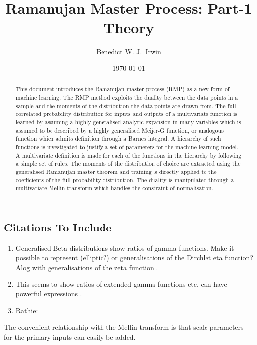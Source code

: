 \documentclass[journal=jcisd8,manuscript=article,layout=onecolumn,pdftex,floatfix,amsmath,amssymb,10pt]{achemso}
\title{Ramanujan Master Process: Part-1 \\ \large Theory }
\author{Benedict W. J.~Irwin}
\affiliation{Optibrium, F5-6 Blenheim House, Cambridge Innovation Park,
Denny End Road, Cambridge, CB25 9PB, United Kingdom}
\date{\today}
\begin{document}
\begin{abstract}
This document introduces the Ramanujan master process (RMP) as a new form of machine learning. The RMP method exploits the duality between the data points in a sample and the moments of the distribution the data points are drawn from. The full correlated probability distribution for inputs and outputs of a multivariate function is learned by assuming a highly generalised analytic expansion in many variables which is assumed to be described by a highly generalised Meijer-G function, or analogous function which admits definition through a Barnes integral. A hierarchy of such functions is investigated to justify a set of parameters for the machine learning model. A multivariate definition is made for each of the functions in the hierarchy by following a simple set of rules. The moments of the distribution of choice are extracted using the generalised Ramanujan master theorem and training is directly applied to the coefficients of the full probability distribution. The duality is manipulated through a multivariate Mellin transform which handles the constraint of normalisation.
\end{abstract}

\tableofcontents

\subsection{Citations To Include}
\begin{enumerate}
\item Generalised Beta distributions show ratios of gamma functions. Make it possible to represent (elliptic?) or generalisations of the Dirchlet eta function? Alog with generalisations of the zeta function \cite{ostrovsky2013theory}.
\item This seems to show ratios of extended gamma functions etc. can have powerful expressions \cite{Luo2013}.
\item Rathie: %
\end{enumerate}
The convenient relationship with the Mellin transform is that scale parameters for the primary inputs can easily be added.
\end{document}
